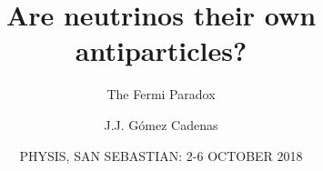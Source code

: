 \documentclass[9pt]{beamer}
\title{Are neutrinos their own antiparticles?}
\subtitle{The Fermi Paradox}
\author{J.J. G\'omez Cadenas}
\institute{Donostia International Physics Center (DIPC)} %
\date[October 6th, 2018] %
{PHYSIS, SAN SEBASTIAN: 2-6 OCTOBER 2018}
\begin{document}
\frame{\titlepage}


%
%
%
%
%


%
%
%
%
%
%
%
\end{document}
